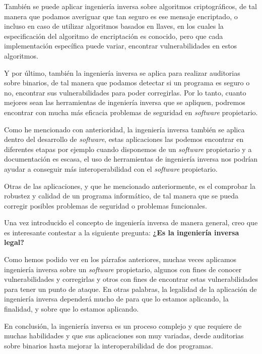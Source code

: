 También se puede aplicar ingeniería inversa sobre algoritmos criptográficos, de tal manera que podamos averiguar que tan seguro es ese mensaje encriptado, o incluso en caso de utilizar
algoritmos basados en llaves, en los cuales la especificación del algoritmo de encriptación es conocido, pero que cada implementación específica puede variar, encontrar vulnerabilidades
en estos algoritmos.

Y por último, también la ingeniería inversa se aplica para realizar auditorias sobre binarios, de tal manera que podamos detectar si un programa es seguro o no, encontrar sus vulnerabilidades
para poder corregirlas. Por lo tanto, cuanto mejores sean las herramientas de ingeniería inversa que se apliquen, podremos encontrar con mucha más eficacia problemas de seguridad en
\textit{software} propietario.

Como he mencionado con anterioridad, la ingeniería inversa también se aplica dentro del desarrollo de \textit{software}, estas aplicaciones las podemos encontrar en diferentes etapas
por ejemplo cuando disponemos de un \textit{software} propietario y a documentación es escasa, el uso de herramientas de ingeniería inversa nos podrían ayudar a conseguir más interoperabilidad
con el \textit{software} propietario.

Otras de las aplicaciones, y que he mencionado anteriormente, es el comprobar la robustez y calidad de un programa informático, de tal manera que se pueda corregir posibles problemas
de seguridad o problemas funcionales.

Una vez introducido el concepto de ingeniería inversa de manera general, creo que es interesante contestar a la siguiente pregunta: \textbf{¿Es la ingeniería inversa legal?}

Como hemos podido ver en los párrafos anteriores, muchas veces aplicamos ingeniería inversa sobre un \textit{software} propietario, algunos con fines de conocer vulnerabilidades y corregirlas
y otros con fines de encontrar estas vulnerabilidades para tener un punto de ataque. En otras palabras, la legalidad de la aplicación de ingeniería inversa dependerá mucho de para
que lo estamos aplicando, la finalidad, y sobre que lo estamos aplicando.

En conclusión, la ingeniería inversa es un proceso complejo y que requiere de muchas habilidades y que sus aplicaciones son muy variadas, desde auditorias sobre binarios hasta mejorar
la interoperabilidad de dos programas.